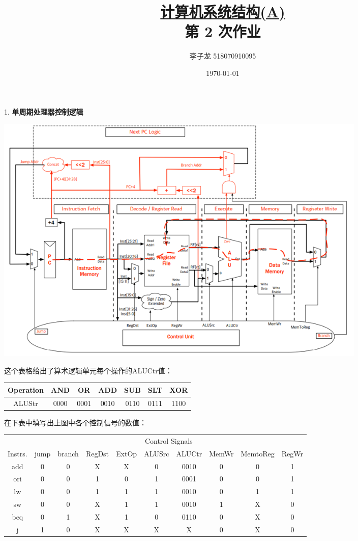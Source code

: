 \documentclass[12pt,a4paper]{article}
\newenvironment{problems}{\begin{list}{}{\renewcommand{\makelabel}[1]{\textbf{##1}.\hfil}}}{\end{list}}
\begin{document}
\title{\normalsize \underline{计算机系统结构(A)}\\\LARGE 第 2 次作业}
\author{李子龙 518070910095}
\date{\today}
\maketitle

\begin{problems}
    \item[1.] \textbf{单周期处理器控制逻辑}
    
    \includegraphics[width=0.8\textwidth]{p1.png}

    这个表格给出了算术逻辑单元每个操作的ALUCtr值：

    \begin{tabular}{|c|cccccc|}
        \hline
        Operation & AND & OR & ADD & SUB & SLT & XOR \\
        \hline
        ALUStr & 0000 & 0001 & 0010 & 0110 & 0111 & 1100\\
        \hline
    \end{tabular}

    在下表中填写出上图中各个控制信号的数值：
    
    \begin{tabular}{c|ccccccccc}
        & \multicolumn{9}{c}{Control Signals}\\
        Instrs. & \sffamily jump & \sffamily branch & \sffamily RegDst &\sffamily ExtOp &\sffamily ALUSrc &\sffamily ALUCtr &\sffamily MemWr &\sffamily MemtoReg &\sffamily RegWr \\ 
        \hline
        \ttfamily add &0&0& X & X & 0 & 0010 & 0 & 0 & 1 \\ 
        \ttfamily ori &0&0& 1 & 0 & 1 & 0001 & 0 & 0 & 1 \\
        \ttfamily lw  &0&0& 1 & 1 & 1 & 0010 & 0 & 1 & 1 \\ 
        \ttfamily sw  &0&0& X & 1 & 1 & 0010 & 1 & X & 0 \\ 
        \ttfamily beq &0&1& X & 1 & 0 & 0110 & 0 & X & 0 \\
        \ttfamily j   &1&0& X & X & X &  X   & 0 & X & 0 \\
        \hline
    \end{tabular}



\end{problems}
\end{document}
